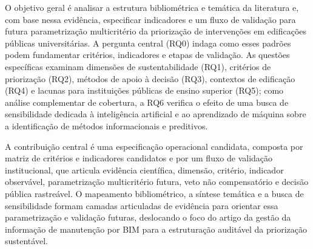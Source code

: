 O objetivo geral é analisar a estrutura bibliométrica e temática da literatura e, com base nessa evidência, especificar indicadores e um fluxo de validação para futura parametrização multicritério da priorização de intervenções em edificações públicas universitárias. A pergunta central (RQ0) indaga como esses padrões podem fundamentar critérios, indicadores e etapas de validação. As questões específicas examinam dimensões de sustentabilidade (RQ1), critérios de priorização (RQ2), métodos de apoio à decisão (RQ3), contextos de edificação (RQ4) e lacunas para instituições públicas de ensino superior (RQ5); como análise complementar de cobertura, a RQ6 verifica o efeito de uma busca de sensibilidade dedicada à inteligência artificial e ao aprendizado de máquina sobre a identificação de métodos informacionais e preditivos.

A contribuição central é uma especificação operacional candidata, composta por matriz de critérios e indicadores candidatos e por um fluxo de validação institucional, que articula evidência científica, dimensão, critério, indicador observável, parametrização multicritério futura, veto não compensatório e decisão pública rastreável. O mapeamento bibliométrico, a síntese temática e a busca de sensibilidade formam camadas articuladas de evidência para orientar essa parametrização e validação futuras, deslocando o foco do artigo da gestão da informação de manutenção por BIM para a estruturação auditável da priorização sustentável.
